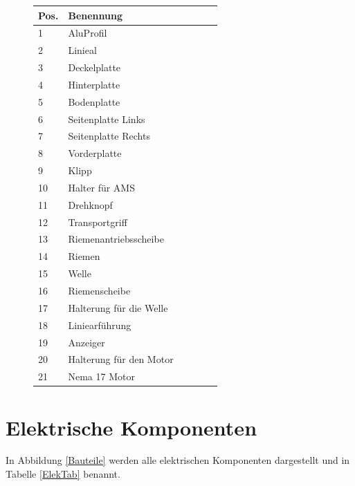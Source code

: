 \begin{figure}[htp]
	\begin{center}
		\fontsize{8}{10}\selectfont
		\begin{tabularx}{\textwidth}{|p{0.4cm}|X|X|X|X|X|} 
			\hline 
			\textbf{Pos.} &  \textbf{Benennung} \\ \hline
			1 & AluProfil   \\ \hline
			2 & Linieal   \\ \hline
			3 & Deckelplatte   \\ \hline
			4 & Hinterplatte   \\ \hline
			5 & Bodenplatte   \\ \hline
			6 & Seitenplatte Links \\ \hline
			7 & Seitenplatte Rechts  \\ \hline
			8 & Vorderplatte  \\ \hline
			9 & Klipp  \\ \hline
			10 & Halter für AMS  \\ \hline
			11 & Drehknopf  \\ \hline
			12 & Transportgriff  \\ \hline
			13 & Riemenantriebsscheibe  \\ \hline
			14 & Riemen  \\ \hline
			15 & Welle  \\ \hline
			16 & Riemenscheibe  \\ \hline
			17 & Halterung für die Welle  \\ \hline
			18 & Liniearführung  \\ \hline
			19 & Anzeiger  \\ \hline
			20 & Halterung für den Motor  \\ \hline
			21 & Nema 17 Motor  \\ \hline		
				
		\end{tabularx}
			\label{BauTab}
	\end{center}
\end{figure}


\section{Elektrische Komponenten}
In Abbildung \ref{Bauteile} werden alle elektrischen Komponenten dargestellt und in Tabelle \ref{ElekTab} benannt.

